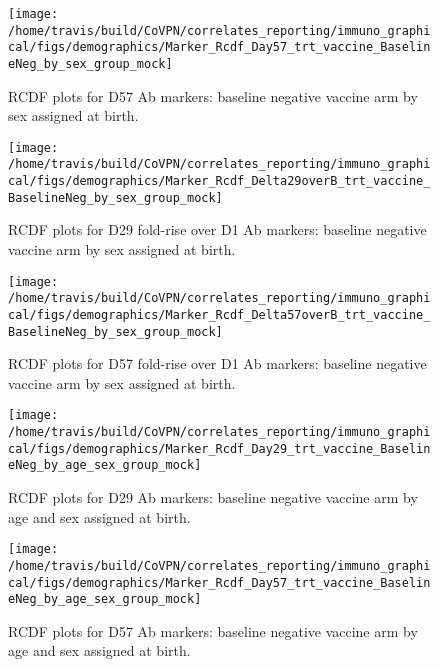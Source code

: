 \documentclass[]{book}
\theoremstyle{definition}
\theoremstyle{definition}
\theoremstyle{definition}
\newcommand{\1}{\mathbbm{1}}
\begin{document}
\clearpage
\begin{figure}[H]

{\centering \texttt{[image: /home/travis/build/CoVPN/correlates\_reporting/immuno\_graphical/figs/demographics/Marker\_Rcdf\_Day57\_trt\_vaccine\_BaselineNeg\_by\_sex\_group\_mock]} 

}

\caption{RCDF plots for D57 Ab markers: baseline negative vaccine arm by sex assigned at birth.}\label{fig:unnamed-chunk-68}
\end{figure}

\clearpage
\begin{figure}[H]

{\centering \texttt{[image: /home/travis/build/CoVPN/correlates\_reporting/immuno\_graphical/figs/demographics/Marker\_Rcdf\_Delta29overB\_trt\_vaccine\_BaselineNeg\_by\_sex\_group\_mock]} 

}

\caption{RCDF plots for D29 fold-rise over D1 Ab markers: baseline negative vaccine arm by sex assigned at birth.}\label{fig:unnamed-chunk-69}
\end{figure}

\clearpage
\begin{figure}[H]

{\centering \texttt{[image: /home/travis/build/CoVPN/correlates\_reporting/immuno\_graphical/figs/demographics/Marker\_Rcdf\_Delta57overB\_trt\_vaccine\_BaselineNeg\_by\_sex\_group\_mock]} 

}

\caption{RCDF plots for D57 fold-rise over D1 Ab markers: baseline negative vaccine arm by sex assigned at birth.}\label{fig:unnamed-chunk-70}
\end{figure}

\clearpage
\begin{figure}[H]

{\centering \texttt{[image: /home/travis/build/CoVPN/correlates\_reporting/immuno\_graphical/figs/demographics/Marker\_Rcdf\_Day29\_trt\_vaccine\_BaselineNeg\_by\_age\_sex\_group\_mock]} 

}

\caption{RCDF plots for D29 Ab markers: baseline negative vaccine arm by age and sex assigned at birth.}\label{fig:unnamed-chunk-71}
\end{figure}

\clearpage
\begin{figure}[H]

{\centering \texttt{[image: /home/travis/build/CoVPN/correlates\_reporting/immuno\_graphical/figs/demographics/Marker\_Rcdf\_Day57\_trt\_vaccine\_BaselineNeg\_by\_age\_sex\_group\_mock]} 

}

\caption{RCDF plots for D57 Ab markers: baseline negative vaccine arm by age and sex assigned at birth.}\label{fig:unnamed-chunk-72}
\end{figure}
\end{document}
